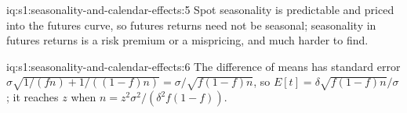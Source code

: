 \begin{solution}{iq:s1:seasonality-and-calendar-effects:5}
Spot seasonality is predictable and priced into the futures curve, so futures returns need not be seasonal; seasonality in futures returns is a risk
premium or a mispricing, and much harder to find.
\end{solution}

\begin{solution}{iq:s1:seasonality-and-calendar-effects:6}
The difference of means has standard error $\sigma\sqrt{1/(fn) + 1/((1 - f)n)} = \sigma/\sqrt{f(1 - f)n}$, so $E[t] = \delta\sqrt{f(1 - f)n}/\sigma$; it
reaches $z$ when $n = z^2\sigma^2/(\delta^2 f(1 - f))$.
\end{solution}
